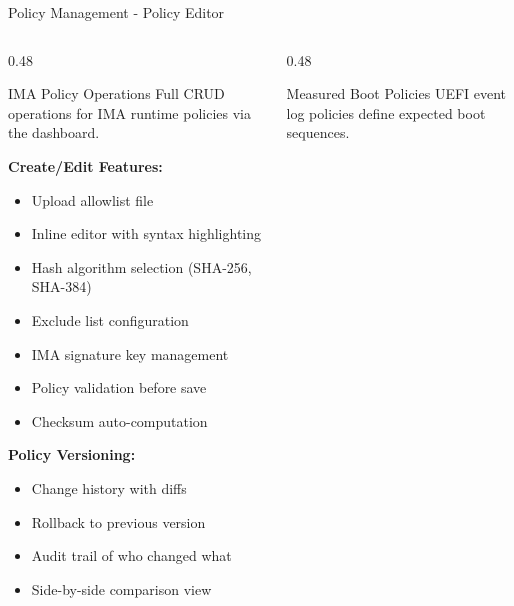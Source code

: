 \begin{frame}{Policy Management - Policy Editor}
  \tiny
  \begin{columns}[T]
    \begin{column}{0.48\textwidth}
      \begin{block}{IMA Policy Operations}
        \tiny
        Full CRUD operations for IMA runtime policies via the dashboard.
      \end{block}

      \vspace{0.05cm}

      \textbf{Create/Edit Features:}
      \vspace{-0.1cm}
      \begin{itemize}
        \setlength{\itemsep}{0pt}
        \item Upload allowlist file
        \item Inline editor with syntax highlighting
        \item Hash algorithm selection (SHA-256, SHA-384)
        \item Exclude list configuration
        \item IMA signature key management
        \item Policy validation before save
        \item Checksum auto-computation
      \end{itemize}

      \vspace{0.05cm}

      \textbf{Policy Versioning:}
      \vspace{-0.1cm}
      \begin{itemize}
        \setlength{\itemsep}{0pt}
        \item Change history with diffs
        \item Rollback to previous version
        \item Audit trail of who changed what
        \item Side-by-side comparison view
      \end{itemize}
    \end{column}
    \begin{column}{0.48\textwidth}
      \begin{block}{Measured Boot Policies}
        \tiny
        UEFI event log policies define expected boot sequences.
      \end{block}

      \vspace{0.05cm}


\end{column}
\end{columns}
\end{frame}
